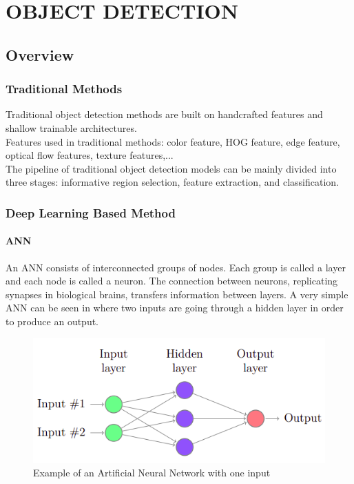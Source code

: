 \chapter{OBJECT DETECTION}

\renewcommand{\headrulewidth}{0.5pt}
\renewcommand{\footrulewidth}{0.5pt}
\thispagestyle{plain}
\pagestyle{fancy}
\fancyhf{}
\raggedright
{}

\section{Overview}

    \subsection{Traditional Methods}
        Traditional object detection methods are built on handcrafted features and shallow trainable architectures. \\
        \vspace{3mm}
        Features used in traditional methods: color feature, HOG feature, edge feature, optical flow features, texture features,... \\
        \vspace{3mm}
        The pipeline of traditional object detection models can be mainly divided into three stages: informative region selection, feature extraction, and classification.
    
    \subsection{Deep Learning Based Method}

        \subsubsection{ANN}
            An ANN consists of interconnected groups of nodes. Each group is called a layer and
            each node is called a neuron. The connection between neurons, replicating synapses
            in biological brains, transfers information between layers. A very simple ANN can be
            seen in where two inputs are going through a hidden layer in order to produce an output.    
            \begin{figure}[H]
                \centering
                \includegraphics[width=0.6\linewidth]{img/ANN.png}
                \caption{Example of an Artificial Neural Network with one input}
            \end{figure}
        
